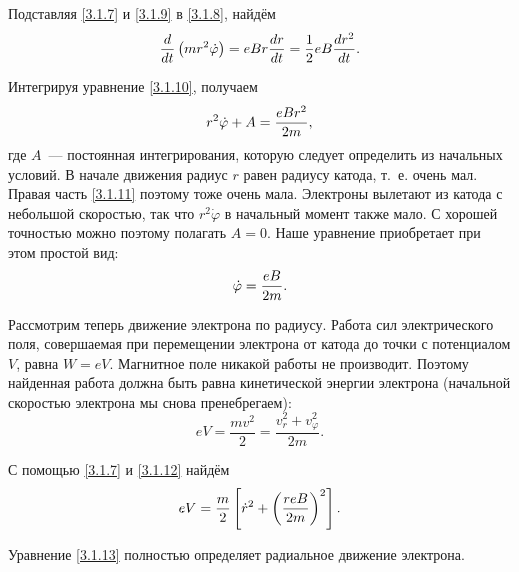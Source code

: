 Подставляя \eqref{3.1.7} и \eqref{3.1.9} в \eqref{3.1.8}, найдём
\begin{equation}
	\frac{d}{dt}\left(mr^2\dot{\varphi}\right)=eBr\frac{dr}{dt}=\frac12eB\frac{dr^2}{dt}.
	\eqmark{3.1.10}
\end{equation}

Интегрируя уравнение \eqref{3.1.10}, получаем
\begin{equation}
	r^2\dot{\varphi}+A=\frac{eBr^2}{2m},
	\eqmark{3.1.11}
\end{equation}
где $A$~--- постоянная интегрирования, которую следует определить из начальных условий. В начале движения радиус $r$ равен радиусу катода, т.~е. очень мал. Правая часть \eqref{3.1.11} поэтому тоже очень мала. Электроны вылетают из катода с небольшой скоростью, так что $r^{2}\dot{\varphi}$ в начальный момент также мало. С хорошей точностью можно поэтому полагать $A=0$. Наше уравнение приобретает при этом простой вид:
\begin{equation}
	\dot{\varphi}=\frac{eB}{2m}.
	\eqmark{3.1.12}
\end{equation}

Рассмотрим теперь движение электрона по радиусу. Работа сил электрического поля, совершаемая при перемещении электрона от катода до точки с потенциалом $V$, равна $W=eV$. Магнитное поле никакой работы не производит. Поэтому найденная работа должна быть равна кинетической энергии электрона (начальной скоростью электрона мы снова пренебрегаем):
\begin{equation*}
	eV=\frac{mv^2}{2}=\frac{v_r^2+v_\varphi^2}{2m}.
\end{equation*}

С помощью \eqref{3.1.7} и \eqref{3.1.12} найдём
\begin{equation}
	eV=\frac{m}{2}\left[\dot{r}^2+\left(\frac{reB}{2m}\right)^2\right].
	\eqmark{3.1.13}
\end{equation}

Уравнение \eqref{3.1.13} полностью определяет радиальное движение электрона.



